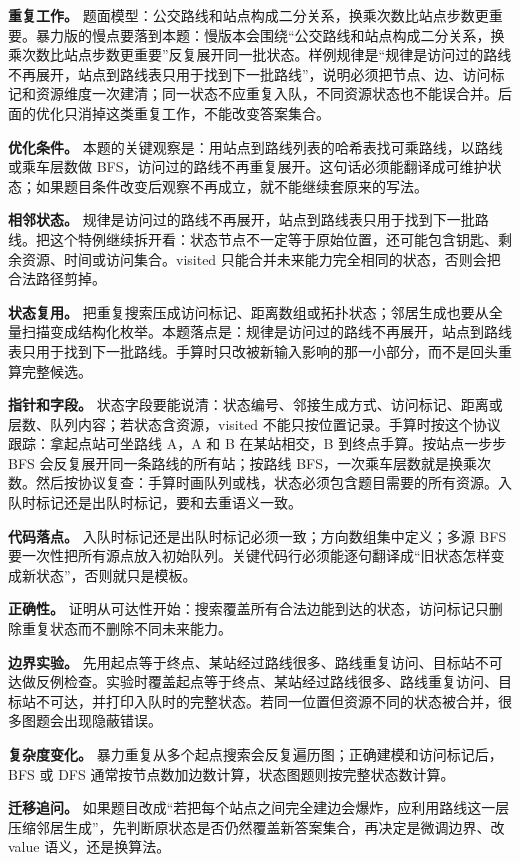 \textbf{重复工作。} 题面模型：公交路线和站点构成二分关系，换乘次数比站点步数更重要。暴力版的慢点要落到本题：慢版本会围绕“公交路线和站点构成二分关系，换乘次数比站点步数更重要”反复展开同一批状态。样例规律是“规律是访问过的路线不再展开，站点到路线表只用于找到下一批路线”，说明必须把节点、边、访问标记和资源维度一次建清；同一状态不应重复入队，不同资源状态也不能误合并。后面的优化只消掉这类重复工作，不能改变答案集合。

\textbf{优化条件。} 本题的关键观察是：用站点到路线列表的哈希表找可乘路线，以路线或乘车层数做 BFS，访问过的路线不再重复展开。这句话必须能翻译成可维护状态；如果题目条件改变后观察不再成立，就不能继续套原来的写法。

\textbf{相邻状态。} 规律是访问过的路线不再展开，站点到路线表只用于找到下一批路线。把这个特例继续拆开看：状态节点不一定等于原始位置，还可能包含钥匙、剩余资源、时间或访问集合。visited 只能合并未来能力完全相同的状态，否则会把合法路径剪掉。

\textbf{状态复用。} 把重复搜索压成访问标记、距离数组或拓扑状态；邻居生成也要从全量扫描变成结构化枚举。本题落点是：规律是访问过的路线不再展开，站点到路线表只用于找到下一批路线。手算时只改被新输入影响的那一小部分，而不是回头重算完整候选。

\textbf{指针和字段。} 状态字段要能说清：状态编号、邻接生成方式、访问标记、距离或层数、队列内容；若状态含资源，visited 不能只按位置记录。手算时按这个协议跟踪：拿起点站可坐路线 A，A 和 B 在某站相交，B 到终点手算。按站点一步步 BFS 会反复展开同一条路线的所有站；按路线 BFS，一次乘车层数就是换乘次数。然后按协议复查：手算时画队列或栈，状态必须包含题目需要的所有资源。入队时标记还是出队时标记，要和去重语义一致。

\textbf{代码落点。} 入队时标记还是出队时标记必须一致；方向数组集中定义；多源 BFS 要一次性把所有源点放入初始队列。关键代码行必须能逐句翻译成“旧状态怎样变成新状态”，否则就只是模板。

\textbf{正确性。} 证明从可达性开始：搜索覆盖所有合法边能到达的状态，访问标记只删除重复状态而不删除不同未来能力。

\textbf{边界实验。} 先用起点等于终点、某站经过路线很多、路线重复访问、目标站不可达做反例检查。实验时覆盖起点等于终点、某站经过路线很多、路线重复访问、目标站不可达，并打印入队时的完整状态。若同一位置但资源不同的状态被合并，很多图题会出现隐蔽错误。

\textbf{复杂度变化。} 暴力重复从多个起点搜索会反复遍历图；正确建模和访问标记后，BFS 或 DFS 通常按节点数加边数计算，状态图题则按完整状态数计算。

\textbf{迁移追问。} 如果题目改成“若把每个站点之间完全建边会爆炸，应利用路线这一层压缩邻居生成”，先判断原状态是否仍然覆盖新答案集合，再决定是微调边界、改 value 语义，还是换算法。

